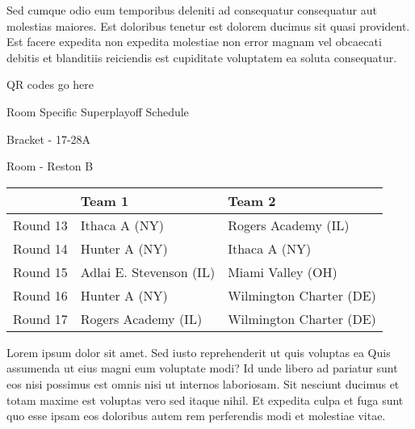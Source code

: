 \documentclass{article}%
\begin{document}
\newline%
Sed cumque odio eum temporibus deleniti ad consequatur consequatur aut molestias maiores. Est doloribus tenetur est dolorem ducimus sit quasi provident. Est facere expedita non expedita molestiae non error magnam vel obcaecati debitis et blanditiis reiciendis est cupiditate voluptatem ea soluta consequatur.%
\vspace*{140pt}%
\begin{center}%
\begin{Huge}%
QR codes go here%
\end{Huge}%
\end{center}%
\newpage%
\begin{center}%
\begin{Huge}%
Room Specific Superplayoff Schedule%
\end{Huge}%
\vspace*{8pt}%
\linebreak%
\begin{Large}%
Bracket {-} 17{-}28A%
\end{Large}%
\vspace*{8pt}%
\linebreak%
\vspace*{8pt}%
\begin{Large}%
Room {-} Reston B%
\end{Large}%
\end{center}%
%
\begin{tabularx}{\textwidth}{|c|Y|Y|}%
\hline%
&Team 1&Team 2\\%
\hline%
Round 13&Ithaca A (NY)&Rogers Academy (IL)\\%
Round 14&Hunter A (NY)&Ithaca A (NY)\\%
Round 15&Adlai E. Stevenson (IL)&Miami Valley (OH)\\%
Round 16&Hunter A (NY)&Wilmington Charter (DE)\\%
Round 17&Rogers Academy (IL)&Wilmington Charter (DE)\\%
\hline%
\end{tabularx}%
\vspace*{8pt}%
\newline%
Lorem ipsum dolor sit amet. Sed iusto reprehenderit ut quis voluptas ea Quis assumenda ut eius magni eum voluptate modi? Id unde libero ad pariatur sunt eos nisi possimus est omnis nisi ut internos laboriosam. Sit nesciunt ducimus et totam maxime est voluptas vero sed itaque nihil. Et expedita culpa et fuga sunt quo esse ipsam eos doloribus autem rem perferendis modi et molestiae vitae.\newline%
\end{document}
